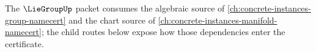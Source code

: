 The $\LieGroupUp$ packet consumes the algebraic source of \autoref{ch:concrete-instances-group-namecert} and the chart source of \autoref{ch:concrete-instances-manifold-namecert}; the child routes below expose how those dependencies enter the certificate.








